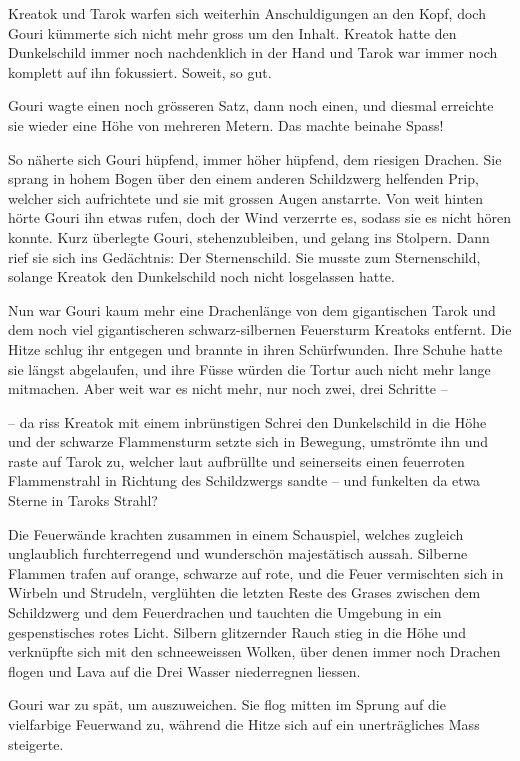 \documentclass[10pt, a4paper, oneside]{book}
\begin{document}
Kreatok und Tarok warfen sich weiterhin Anschuldigungen an den Kopf, doch Gouri kümmerte sich nicht mehr gross um den Inhalt. Kreatok hatte den Dunkelschild immer noch nachdenklich in der Hand und Tarok war immer noch komplett auf ihn fokussiert. Soweit, so gut.

Gouri wagte einen noch grösseren Satz, dann noch einen, und diesmal erreichte sie wieder eine Höhe von mehreren Metern. Das machte beinahe Spass!

So näherte sich Gouri hüpfend, immer höher hüpfend, dem riesigen Drachen. Sie sprang in hohem Bogen über den einem anderen Schildzwerg helfenden Prip, welcher sich aufrichtete und sie mit grossen Augen anstarrte. Von weit hinten hörte Gouri ihn etwas rufen, doch der Wind verzerrte es, sodass sie es nicht hören konnte. Kurz überlegte Gouri, stehenzubleiben, und gelang ins Stolpern. Dann rief sie sich ins Gedächtnis: Der Sternenschild. Sie musste zum Sternenschild, solange Kreatok den Dunkelschild noch nicht losgelassen hatte.

Nun war Gouri kaum mehr eine Drachenlänge von dem gigantischen Tarok und dem noch viel gigantischeren schwarz-silbernen Feuersturm Kreatoks entfernt. Die Hitze schlug ihr entgegen und brannte in ihren Schürfwunden. Ihre Schuhe hatte sie längst abgelaufen, und ihre Füsse würden die Tortur auch nicht mehr lange mitmachen. Aber weit war es nicht mehr, nur noch zwei, drei Schritte –

– da riss Kreatok mit einem inbrünstigen Schrei den Dunkelschild in die Höhe und der schwarze Flammensturm setzte sich in Bewegung, umströmte ihn und raste auf Tarok zu, welcher laut aufbrüllte und seinerseits einen feuerroten Flammenstrahl in Richtung des Schildzwergs sandte – und funkelten da etwa Sterne in Taroks Strahl?

Die Feuerwände krachten zusammen in einem Schauspiel, welches zugleich unglaublich furchterregend und wunderschön majestätisch aussah. Silberne Flammen trafen auf orange, schwarze auf rote, und die Feuer vermischten sich in Wirbeln und Strudeln, verglühten die letzten Reste des Grases zwischen dem Schildzwerg und dem Feuerdrachen und tauchten die Umgebung in ein gespenstisches rotes Licht. Silbern glitzernder Rauch stieg in die Höhe und verknüpfte sich mit den schneeweissen Wolken, über denen immer noch Drachen flogen und Lava auf die Drei Wasser niederregnen liessen.

Gouri war zu spät, um auszuweichen. Sie flog mitten im Sprung auf die vielfarbige Feuerwand zu, während die Hitze sich auf ein unerträgliches Mass steigerte.
\end{document}
